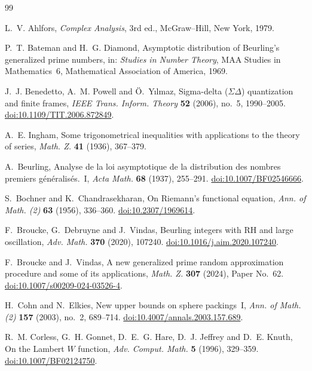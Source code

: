 \documentclass[11pt,reqno]{amsart}
\numberwithin{equation}{section}
\theoremstyle{plain}
\theoremstyle{definition}
\theoremstyle{remark}
\begin{document}
\begin{thebibliography}{99}

L.~V. Ahlfors, \emph{Complex Analysis}, 3rd ed., McGraw--Hill, New York, 1979.

P.~T. Bateman and H.~G. Diamond, Asymptotic distribution of Beurling's generalized prime numbers, in: \emph{Studies in Number Theory}, MAA Studies in Mathematics~6, Mathematical Association of America, 1969.

J.~J. Benedetto, A.~M. Powell and \"O.~Y{\i}lmaz, Sigma-delta ($\Sigma\Delta$) quantization and finite frames, \emph{IEEE Trans. Inform. Theory} \textbf{52} (2006), no.~5, 1990--2005.
\href{https://doi.org/10.1109/TIT.2006.872849}{doi:10.1109/TIT.2006.872849}.

A.~E. Ingham, Some trigonometrical inequalities with applications to the theory of series, \emph{Math. Z.} \textbf{41} (1936), 367--379.

A.~Beurling, Analyse de la loi asymptotique de la distribution des nombres premiers g\'en\'eralis\'es.~I, \emph{Acta Math.} \textbf{68} (1937), 255--291.
\href{https://doi.org/10.1007/BF02546666}{doi:10.1007/BF02546666}.

S.~Bochner and K.~Chandrasekharan, On Riemann's functional equation, \emph{Ann. of Math. (2)} \textbf{63} (1956), 336--360.
\href{https://doi.org/10.2307/1969614}{doi:10.2307/1969614}.

F.~Broucke, G.~Debruyne and J.~Vindas, Beurling integers with RH and large oscillation, \emph{Adv. Math.} \textbf{370} (2020), 107240.
\href{https://doi.org/10.1016/j.aim.2020.107240}{doi:10.1016/j.aim.2020.107240}.

F.~Broucke and J.~Vindas, A new generalized prime random approximation procedure and some of its applications, \emph{Math. Z.} \textbf{307} (2024), Paper No.~62.
\href{https://doi.org/10.1007/s00209-024-03526-4}{doi:10.1007/s00209-024-03526-4}.

H.~Cohn and N.~Elkies, New upper bounds on sphere packings~I, \emph{Ann. of Math. (2)} \textbf{157} (2003), no.~2, 689--714.
\href{https://doi.org/10.4007/annals.2003.157.689}{doi:10.4007/annals.2003.157.689}.

R.~M. Corless, G.~H. Gonnet, D.~E.~G. Hare, D.~J. Jeffrey and D.~E. Knuth, On the Lambert $W$ function, \emph{Adv. Comput. Math.} \textbf{5} (1996), 329--359.
\href{https://doi.org/10.1007/BF02124750}{doi:10.1007/BF02124750}.


\end{thebibliography}
\end{document}
